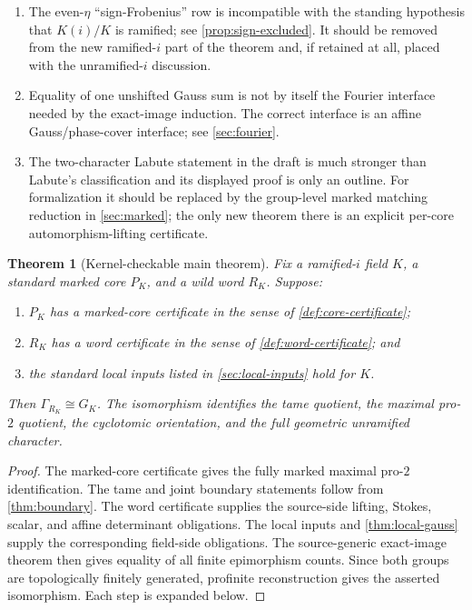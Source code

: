 \documentclass[11pt,reqno]{amsart}
\newtheorem{theorem}{Theorem}[section]
\theoremstyle{remark}
\numberwithin{equation}{section}
\begin{document}
\begin{enumerate}
\item The even-\(\eta\) ``sign-Frobenius'' row is incompatible with the
standing hypothesis that \(K(i)/K\) is ramified; see
\cref{prop:sign-excluded}.  It should be removed from the new ramified-\(i\)
part of the theorem and, if retained at all, placed with the
unramified-\(i\) discussion.
\item Equality of one unshifted Gauss sum is not by itself the Fourier
interface needed by the exact-image induction.  The correct interface is
an affine Gauss/phase-cover interface; see \cref{sec:fourier}.
\item The two-character Labute statement in the draft is much stronger
than Labute's classification and its displayed proof is only an outline.
For formalization it should be replaced by the group-level marked matching
reduction in \cref{sec:marked}; the only new theorem there is an explicit
per-core automorphism-lifting certificate.
\end{enumerate}

\begin{theorem}[Kernel-checkable main theorem]\label{thm:certificate-main}
Fix a ramified-\(i\) field \(K\), a standard marked core \(P_K\), and a
wild word \(R_K\).  Suppose:
\begin{enumerate}
\item \(P_K\) has a marked-core certificate in the sense of
\cref{def:core-certificate};
\item \(R_K\) has a word certificate in the sense of
\cref{def:word-certificate}; and
\item the standard local inputs listed in \cref{sec:local-inputs} hold for
\(K\).
\end{enumerate}
Then \(\Gamma_{R_K}\cong G_K\).  The isomorphism identifies the tame
quotient, the maximal pro-\(2\) quotient, the cyclotomic orientation, and
the full geometric unramified character.
\end{theorem}

\begin{proof}
The marked-core certificate gives the fully marked maximal pro-\(2\)
identification.  The tame and joint boundary statements follow from
\cref{thm:boundary}.  The word certificate supplies the source-side
lifting, Stokes, scalar, and affine determinant obligations.  The local
inputs and \cref{thm:local-gauss} supply the corresponding field-side
obligations.  The source-generic exact-image theorem then gives equality of
all finite epimorphism counts.  Since both groups are topologically finitely
generated, profinite reconstruction gives the asserted isomorphism.  Each
step is expanded below.
\end{proof}
\end{document}
